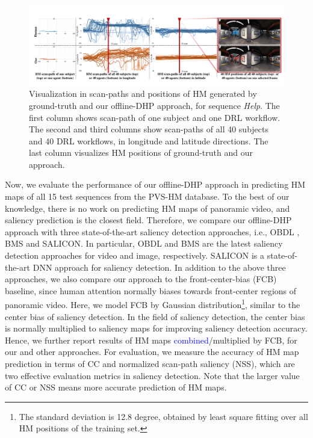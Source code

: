 \documentclass[10pt,journal,compsoc]{IEEEtran}
\begin{document}
\begin{figure}
	\begin{center}
		\centerline{\includegraphics[width=2\columnwidth]{figures/experiment/scanpath_objective_result}}%
		\caption{\footnotesize{Visualization in scan-paths and positions of HM generated by ground-truth and our offline-DHP approach, for sequence \textit{Help}. The first column shows scan-path of one subject and one DRL workflow. The second and third columns show scan-paths of all 40 subjects and 40 DRL workflows, in longitude and latitude directions. The last column visualizes HM positions of ground-truth and our approach.}}
		\label{scan-path-example}
	\end{center}
\end{figure}

Now, we evaluate the performance of our offline-DHP approach in predicting HM maps of all 15 test sequences from the PVS-HM database. To the best of our knowledge, there is no work on predicting HM maps of panoramic video, and saliency prediction is the closest field. Therefore, we compare our offline-DHP approach with three state-of-the-art saliency detection approaches, i.e.,  OBDL  \cite{hossein2015many}, BMS \cite{zhang2016exploiting} and SALICON\cite{huang2015salicon}.
In particular, OBDL  \cite{hossein2015many} and BMS \cite{zhang2016exploiting} are the latest saliency detection approaches for video and image, respectively.
SALICON\cite{huang2015salicon} is a state-of-the-art DNN approach for saliency detection.
In addition to the above three approaches, we also compare our approach to the front-center-bias (FCB) baseline, since human attention normally biases towards front-center regions of panoramic video.
Here, we model FCB by Gaussian distribution\footnote{The standard deviation is 12.8 degree, obtained by least square fitting over all HM positions of the training set.}, similar to the center bias of saliency detection.
In the field of saliency detection, the center bias  \cite{borji2013state} is normally multiplied to saliency maps for improving saliency detection accuracy. Hence, we further report results of HM maps \textcolor{blue}{combined}/multiplied by FCB, for our and other approaches.
For evaluation, we measure the accuracy of HM map prediction in terms of CC and normalized scan-path saliency (NSS), which are two effective evaluation metrics \textcolor{blue}{\cite{Li_2015_ICCV}} in saliency detection.
Note that the larger value of CC or NSS means more accurate prediction of HM maps.
\end{document}
